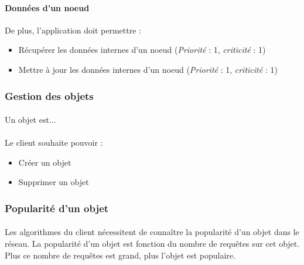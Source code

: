 \documentclass[12pt]{article}
\newcommand{\besoin}[2] {
  (\textit{Priorité} : #1, \textit{criticité} : #2)
}
\begin{document}
\paragraph{Données d'un noeud} De plus, l'application doit permettre :
\begin{itemize}
 \item Récupérer les données internes d'un noeud \besoin{1}{1}
 \item Mettre à jour les données internes d'un noeud \besoin{1}{1}
\end{itemize}

\subsubsection{Gestion des objets}

\paragraph{} Un objet est...

\paragraph{} Le client souhaite pouvoir :
\begin{itemize}
 \item Créer un objet
 \item Supprimer un objet
\end{itemize}

\subsubsection{Popularité d'un objet}

\paragraph{} Les algorithmes du client nécessitent de connaître la popularité d'un objet dans le réseau.
La popularité d'un objet est fonction du nombre de requêtes sur cet objet. Plus ce nombre de requêtes est grand, plus l'objet est populaire.


\end{document}
